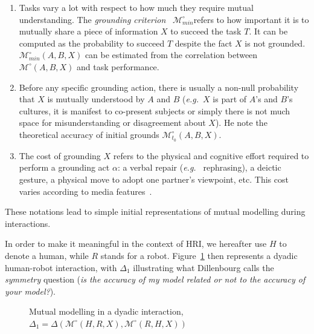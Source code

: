\documentclass{sig-alternate}
\newcommand{\eg}{{\textit{e.g.~}}}
\newcommand{\Model}[3]{{$\mathcal{M}^{\circ}(#1, #2, #3)$}}
\newcommand{\groundingcriterion}{{$\mathcal{M}^{\circ}_{min}$}}
\begin{document}
\begin{enumerate}

    \item Tasks vary a lot with respect to how much they require mutual
        understanding.  The \emph{grounding criterion}~\cite{clark1986referring}
        \groundingcriterion refers to
        how important it is to mutually share a piece of information $X$ to
        succeed the task $T$. It can be computed as the probability to succeed $T$
        despite the fact $X$ is not grounded. $\mathcal{M}^{\circ}_{min}(A,B,X)$
        can be estimated from the correlation between \Model{A}{B}{X} and task
        performance. 

    \item Before any specific grounding action, there is usually a non-null
        probability that $X$ is mutually understood by $A$ and $B$ (\eg $X$
        is part of $A$'s and $B$'s cultures, it is manifest to co-present
        subjects or simply there is not much space for misunderstanding
        or disagreement about $X$). He note the theoretical accuracy of
        initial grounds $\mathcal{M}^{\circ}_{t_0}(A,B,X)$.

    \item The cost of grounding $X$ refers to the physical and cognitive effort
        required to perform a grounding act $\alpha$: a verbal repair (\eg
        rephrasing), a deictic gesture, a physical move to adopt one partner's
        viewpoint, etc. This cost varies according to media
        features~\cite{clark1991grounding}.

\end{enumerate}

These notations lead to simple initial representations of mutual modelling
during interactions.

In order to make it meaningful in the context of HRI, we hereafter use $H$ to
denote a human, while $R$ stands for a robot. Figure~\ref{mm_symmetry} then
represents a dyadic human-robot interaction, with $\Delta_1$ illustrating what
Dillenbourg calls the \emph{symmetry} question ({\it is the accuracy of my model
related or not to the accuracy of your model?}).

\begin{figure}[htb]
\centering


\caption{Mutual modelling in a dyadic interaction, $\Delta_1 =
    \Delta(\mathcal{M}^{\circ} (H,R,X),
\mathcal{M}^{\circ} (R,H,X))$}

\label{mm_symmetry}
\end{figure}
\end{document}
